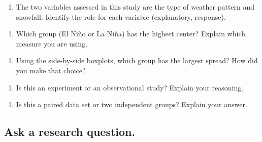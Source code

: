 \documentclass[
]{report}
\providecommand{\tightlist}{%
  \setlength{\itemsep}{0pt}\setlength{\parskip}{0pt}}
\begin{document}
\begin{enumerate}
\def\labelenumi{\arabic{enumi}.}
\tightlist
\item
  The two variables assessed in this study are the type of weather pattern and snowfall. Identify the role for each variable (explanatory, response).
\end{enumerate}

\vspace{1in}

\begin{enumerate}
\def\labelenumi{\arabic{enumi}.}
\setcounter{enumi}{1}
\tightlist
\item
  Which group (El Ni\~{n}o or La Ni\~{n}a) has the highest center? Explain which measure you are using.
\end{enumerate}

\vspace{1in}

\begin{enumerate}
\def\labelenumi{\arabic{enumi}.}
\setcounter{enumi}{2}
\tightlist
\item
  Using the side-by-side boxplots, which group has the largest spread? How did you make that choice?
\end{enumerate}

\vspace{1in}

\begin{enumerate}
\def\labelenumi{\arabic{enumi}.}
\setcounter{enumi}{3}
\tightlist
\item
  Is this an experiment or an observational study? Explain your reasoning.
\end{enumerate}

\vspace{1in}

\begin{enumerate}
\def\labelenumi{\arabic{enumi}.}
\setcounter{enumi}{4}
\tightlist
\item
  Is this a paired data set or two independent groups? Explain your answer.
\end{enumerate}

\vspace{1in}

\hypertarget{ask-a-research-question.}{%
\subsection{Ask a research question.}\label{ask-a-research-question.}}
\end{document}
